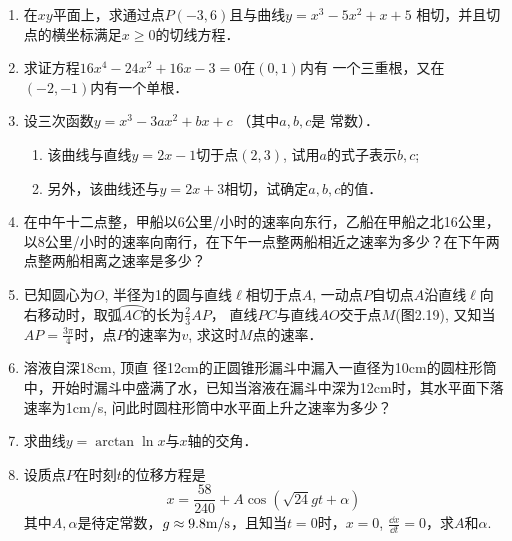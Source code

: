 \begin{enumerate}
\item 在$xy$平面上，求通过点$P(-3, 6)$且与曲线$y=x^3-5x^2+x+5$
相切，并且切点的横坐标满足$x\ge 0$的切线方程．

\item 求证方程$16x^4-24x^2+16x-3=0$在$(0, 1)$内有
一个三重根，又在$(-2,-1)$内有一个单根．

\item 设三次函数$y=x^3-3ax^2+bx+c$ （其中$a,b,c$是
常数）．
\begin{enumerate}
    \item 该曲线与直线$y=2x-1$切于点$(2, 3)$, 试用$a$的式子表示$b,c$;
    \item 另外，该曲线还与$y=2x+3$相切，试确定$a,b,c$的值．
\end{enumerate}
\item 在中午十二点整，甲船以6公里/小时的速率向东行，乙船在甲船之北16公里，以8公里/小时的速率向南行，在下午一点整两船相近之速率为多少？在下午两点整两船相离之速率是多少？
\item 已知圆心为$O$, 半径为1的圆与直线$\ell$相切于点$A$, 一动点$P$自切点$A$沿直线$\ell$向右移动时，取弧$\wideparen{AC}$的长为$\frac{2}{3}AP$，
直线$PC$与直线$AO$交于点$M$(图2.19), 又知当$AP=\frac{3\pi}{4}$时，点$P$的速率为$v$, 求这时$M$点的速率．

\begin{figure}[htp]
    \centering
{}    
    \caption{}
\end{figure}

\item 溶液自深18cm, 顶直
径12cm的正圆锥形漏斗中漏入一直径为10cm的圆柱形筒中，开始时漏斗中盛满了水，已知当溶液在漏斗中深为12cm时，其水平面下落速率为1cm/s, 问此时圆柱形筒中水平面上升之速率为多少？
\item 求曲线$y=\arctan\ln x$与$x$轴的交角．
\item 设质点$P$在时刻$t$的位移方程是
\[x=\frac{58}{240}+A\cos\left(\sqrt{24}gt+\alpha\right)\]
其中$A,\alpha$是待定常数，$g\approx 9.8{\rm m/s}$，且知当$t=0$时，$x=0$, $\frac{\dd x}{\dd t}=0$，求$A$和$\alpha$.



\end{enumerate}
